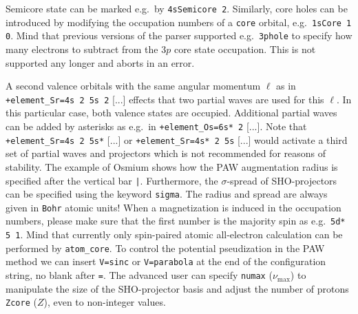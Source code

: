 \documentclass[oribibl]{llncs}
\newcommand{\um}[1]{_{\mathrm{#1}}}
\newcommand{\ttt}[1]{\texttt{#1}}
\begin{document}
\noindent
Semicore state can be marked e.g.~by \ttt{4sSemicore 2}.
Similarly, core holes can be introduced by modifying the occupation numbers of
a \ttt{core} orbital, e.g.~\ttt{1sCore 1 0}.
Mind that previous versions of the parser supported e.g.~\ttt{3phole}
to specify how many electrons to subtract from the $3p$ core state occupation.
This is not supported any longer and aborts in an error.

\noindent
A second valence orbitals with the same angular momentum $\ell$ as in \ttt{+element\_Sr=4s 2 5s 2} [...] 
effects that two partial waves are used for this $\ell$. In this particular case, both valence states are occupied.
Additional partial waves can be added by asterisks as e.g.~in \ttt{+element\_Os=6s* 2} [...].
Note that \ttt{+element\_Sr=4s 2 5s*} [...] or \ttt{+element\_Sr=4s* 2 5s} [...] %
would activate a third set of partial waves and projectors which is not recommended for reasons of stability.
The example of Osmium shows how the \ac{PAW} augmentation radius is specified after the vertical bar \ttt{|}.
Furthermore, the $\sigma$-spread of \ac{SHO}-projectors can be specified using the keyword \ttt{sigma}.
The radius and spread are always given in \ttt{Bohr} atomic units!
\noindent
When a magnetization is induced in the occupation numbers,
please make sure that the first number is the majority spin as e.g.~\ttt{5d* 5 1}.
Mind that currently only spin-paired atomic all-electron calculation can be performed by \ttt{atom\_core}.
%
To control the potential pseudization in the \ac{PAW} method we can insert 
\ttt{V=sinc} or \ttt{V=parabola} at the end of the configuration string, no blank after \ttt{=}.
The advanced user can specify \ttt{numax} ($\nu\um{max}$) to manipulate the size of the \ac{SHO}-projector basis
and adjust the number of protons \ttt{Zcore} ($Z$), even to non-integer values.
%
%
%
\end{document}
